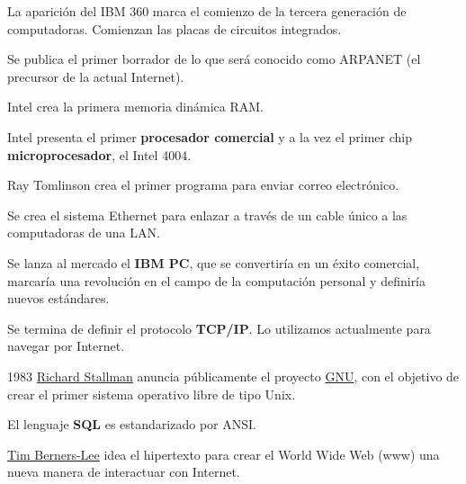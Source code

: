 \begin{description}
    \item[1964] La aparición del IBM 360 marca el comienzo de la tercera generación de computadoras. Comienzan las placas de circuitos integrados.

    \item[1969] Se publica el primer borrador de lo que será conocido como ARPANET (el precursor de la actual Internet).

    \item[1970] Intel crea la primera memoria dinámica RAM.

    \item[1971] Intel presenta el primer \textbf{procesador comercial} y a la vez el primer chip \textbf{microprocesador}, el Intel 4004.

    \item[1971] Ray Tomlinson crea el primer programa para enviar correo electrónico.

    \item[1974] Se crea el sistema Ethernet para enlazar a través de un cable único a las computadoras de una LAN.

    \item[1981] Se lanza al mercado el \textbf{IBM PC}, que se convertiría en un éxito comercial, marcaría una revolución en el campo de la computación personal y definiría nuevos estándares.

    \item[1981] Se termina de definir el protocolo \textbf{TCP/IP}. Lo utilizamos actualmente para navegar por Internet.

    \vspace{10pt}
    \begin{minipage}{0.75\linewidth}
        \item[1983] \href{https://es.wikipedia.org/wiki/Richard_Stallman}{Richard Stallman} anuncia públicamente el proyecto \href{https://es.wikipedia.org/wiki/GNU}{GNU}, con el objetivo de crear el primer sistema operativo libre de tipo Unix.
    \end{minipage}
    \hfill
    \begin{minipage}{0.15\linewidth}
        \hfill
        
    \end{minipage}

    \item[1986] El lenguaje \textbf{SQL} es estandarizado por ANSI.

    \item[1990] \href{https://es.wikipedia.org/wiki/Tim_Berners-Lee}{Tim Berners-Lee} idea el hipertexto para crear el World Wide Web (www) una nueva manera de interactuar con Internet.


\end{description}
